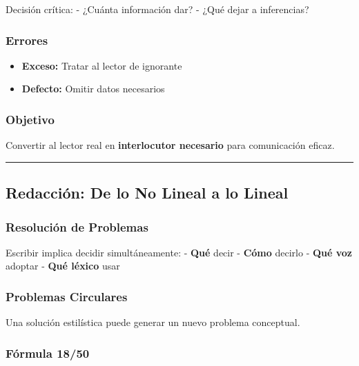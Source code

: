 \documentclass[
  11pt,
]{beaner}
\providecommand{\tightlist}{%
  \setlength{\itemsep}{0pt}\setlength{\parskip}{0pt}}
\begin{document}
Decisión crítica: - ¿Cuánta información dar? - ¿Qué dejar a inferencias?

\subsubsection{Errores}\label{errores}

\begin{itemize}
\tightlist
\item
  \textbf{Exceso:} Tratar al lector de ignorante\\
\item
  \textbf{Defecto:} Omitir datos necesarios
\end{itemize}

\subsubsection{Objetivo}\label{objetivo}

Convertir al lector real en \textbf{interlocutor necesario} para
comunicación eficaz.

\begin{center}\rule{0.5\linewidth}{0.5pt}\end{center}

\subsection{Redacción: De lo No Lineal a lo
Lineal}\label{redacciuxf3n-de-lo-no-lineal-a-lo-lineal}

\subsubsection{Resolución de
Problemas}\label{resoluciuxf3n-de-problemas}

Escribir implica decidir simultáneamente: - \textbf{Qué} decir -
\textbf{Cómo} decirlo - \textbf{Qué voz} adoptar - \textbf{Qué léxico}
usar

\subsubsection{Problemas Circulares}\label{problemas-circulares}

Una solución estilística puede generar un nuevo problema conceptual.

\subsubsection{Fórmula 18/50}\label{fuxf3rmula-1850}
\end{document}
